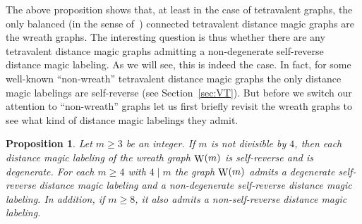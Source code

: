 \documentclass[11 pt,english]{article}
\newcommand{\Wr}{\mathop{\rm W}}
\newtheorem{proposition}[theorem]{Proposition}
\theoremstyle{definition}
\begin{document}
The above proposition shows that, at least in the case of tetravalent graphs, the only balanced (in the sense of~\cite{AnhCicPetTep15}) connected tetravalent distance magic graphs are the wreath graphs. The interesting question is thus whether there are any tetravalent distance magic graphs admitting a non-degenerate self-reverse distance magic labeling. As we will see, this is indeed the case. In fact, for some well-known ``non-wreath'' tetravalent distance magic graphs the only distance magic labelings are self-reverse (see Section~\ref{sec:VT}). But before we switch our attention to ``non-wreath'' graphs let us first briefly revisit the wreath graphs to see what kind of distance magic labelings they admit.

\begin{proposition}
\label{pro:wreath}
Let $m \geq 3$ be an integer. If $m$ is not divisible by $4$, then each distance magic labeling of the wreath graph $\Wr(m)$ is self-reverse and is degenerate. For each $m \geq 4$ with $4 \mid m$ the graph $\Wr(m)$ admits a degenerate self-reverse distance magic labeling and a non-degenerate self-reverse distance magic labeling. In addition, if $m \geq 8$, it also admits a non-self-reverse distance magic labeling.
\end{proposition}
\end{document}
